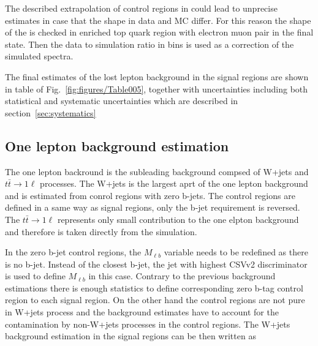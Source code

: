 The described extrapolation of control regions in \MET could lead to unprecise estimates in case that the \MET shape in data and MC differ. For this reason the shape of the \MET is checked in enriched top quark region with electron muon pair in the final state. Then the data to simulation ratio in \MET bins is used as a correction of the simulated \MET spectra. 

The final estimates of the lost lepton background in the signal regions are shown in table of Fig.~\ref{fig:figures/Table005}, together with uncertainties including both statistical and systematic uncertainties which are described in section~\ref{sec:systematics}


\subsection{One lepton background estimation}


The  one lepton backround is the subleading background compsed of W+jets and $t\bar{t} \to 1\ell$ processes. The W+jets is the largest aprt of the one lepton background and is estimated from conrol regions with zero b-jets. The control regions are defined in a same way as signal regions, only the b-jet requirement is reversed. The   $t\bar{t} \to 1\ell$ represents only small contribution to the one elpton background and therefore is taken directly from the simulation.

In the zero b-jet control regions, the $M_{\ell b}$ variable needs to be redefined as there is no b-jet. Instead of the closest b-jet, the jet with highest CSVv2 discriminator is used to define $M_{\ell b}$ in this case. Contrary to the previous background estimations there is enough statistics to define corresponding zero b-tag control region to each signal region. On the other hand the control regions are not pure in W+jets process and the background estimates have to account for the contamination by non-W+jets processes in the control regions. The W+jets background estimation in the signal regions can be then written as

